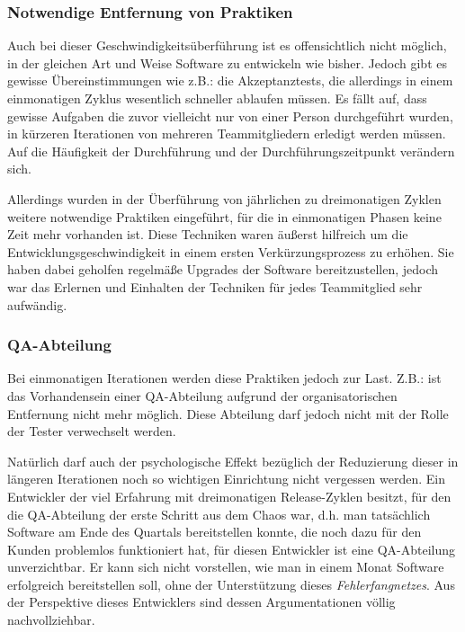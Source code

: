 \subsubsection{Notwendige Entfernung von Praktiken}
\label{minisec:monat-entfernte-praktiken}
Auch bei dieser Geschwindigkeitsüberführung ist es offensichtlich nicht
möglich, in der gleichen Art und Weise Software zu entwickeln wie bisher.
Jedoch gibt es gewisse Übereinstimmungen wie z.B.: die Akzeptanztests, die
allerdings in einem einmonatigen Zyklus wesentlich schneller ablaufen müssen.
Es fällt auf, dass  gewisse Aufgaben die zuvor vielleicht nur von einer Person
durchgeführt wurden, in kürzeren Iterationen von mehreren Teammitgliedern
erledigt werden müssen. Auf die Häufigkeit der Durchführung und der
Durchführungszeitpunkt verändern sich.

Allerdings wurden in der Überführung von jährlichen zu dreimonatigen Zyklen
weitere notwendige Praktiken eingeführt, für die in einmonatigen Phasen keine
Zeit mehr vorhanden ist. Diese Techniken waren äußerst hilfreich um die
Entwicklungsgeschwindigkeit in einem ersten Verkürzungsprozess zu erhöhen. Sie
haben dabei geholfen regelmäße Upgrades der Software bereitzustellen, jedoch
war das Erlernen und Einhalten der Techniken für jedes Teammitglied sehr
aufwändig.

\subsubsection{QA-Abteilung}
\label{minisec:qa-abteilung}

Bei einmonatigen Iterationen werden diese Praktiken jedoch zur Last. Z.B.: ist
das Vorhandensein einer QA-Abteilung aufgrund der organisatorischen Entfernung
nicht mehr möglich. Diese Abteilung darf jedoch nicht mit der Rolle der Tester
verwechselt werden.

Natürlich darf auch der psychologische Effekt bezüglich der Reduzierung
dieser in längeren Iterationen noch so wichtigen Einrichtung nicht vergessen
werden.  Ein Entwickler der viel Erfahrung mit dreimonatigen Release-Zyklen
besitzt, für den die QA-Abteilung der erste Schritt aus dem Chaos war, d.h.
man tatsächlich Software am Ende des Quartals bereitstellen konnte, die noch
dazu für den Kunden problemlos funktioniert hat, für diesen Entwickler ist
eine QA-Abteilung unverzichtbar. Er kann sich nicht vorstellen, wie man in
einem Monat Software erfolgreich bereitstellen soll, ohne der Unterstützung
dieses \emph{Fehlerfangnetzes}. Aus der Perspektive dieses Entwicklers sind
dessen Argumentationen völlig nachvollziehbar.

